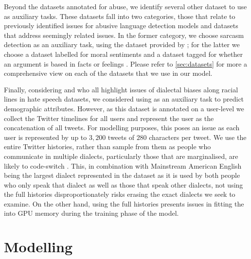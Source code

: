 Beyond the datasets annotated for abuse, we identify several other dataset to use as auxiliary tasks. These datasets fall into two categories, those that relate to previously identified issues for abusive language detection models and datasets that address seemingly related issues. In the former category, we choose sarcasm detection as an auxiliary task, using the dataset provided by \citet{Oraby_sarcasm:2016}; for the latter we choose a dataset labelled for moral sentiments \citet{Hoover:2019} and a dataset tagged for whether an argument is based in facts or feelings \citet{Oraby_factfeel:2015}. Please refer to \autoref{sec:datasets} for more a comprehensive view on each of the datasets that we use in our model.

Finally, considering \citet{Waseem:2018,Davidson:2019} and \citet{Sap:2019} who all highlight issues of dialectal biases along racial lines in hate speech datasets, we considered using \citet{Preotiuc-Unger:2018} as an auxiliary task to predict demographic attributes. However, as this dataset is annotated on a user-level we collect the Twitter timelines for all users and represent the user as the concatenation of all tweets. For modelling purposes, this poses an issue as each user is represented by up to $3,200$ tweets of $280$ characters per tweet. We use the entire Twitter histories, rather than sample from them as people who communicate in multiple dialects, particularly those that are marginalised, are likely to code-switch \cite{CITE: AAE code switching paper}. This, in combination with Mainstream American English being the largest dialect represented in the dataset as it is used by both people who only speak that dialect as well as those that speak other dialects, not using the full histories disproportionately risks erasing the exact dialects we seek to examine. On the other hand, using the full histories presents issues in fitting the into GPU memory during the training phase of the model.


\section{Modelling}


